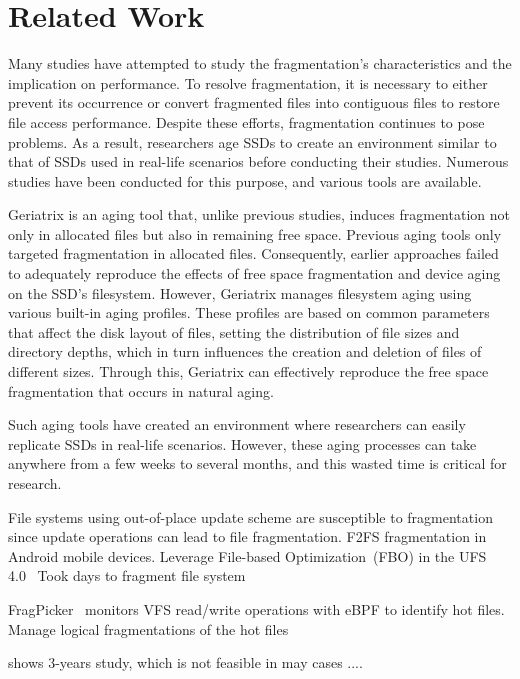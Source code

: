 \section{Related Work}
\label{s:related}

Many studies have attempted to study the fragmentation's characteristics and the implication on performance.
To resolve fragmentation, it is necessary to either prevent its occurrence or convert fragmented files into contiguous files to restore file access performance.
Despite these efforts, fragmentation continues to pose problems.
As a result, researchers age SSDs to create an environment similar to that of SSDs used in real-life scenarios before conducting their studies.
Numerous studies have been conducted for this purpose, and various tools are available.

Geriatrix\cite{geriatrix:atc18} is an aging tool that, unlike previous studies, induces fragmentation not only in allocated files but also in remaining free space.
Previous aging tools only targeted fragmentation in allocated files.
Consequently, earlier approaches failed to adequately reproduce the effects of free space fragmentation and device aging on the SSD's filesystem.
However, Geriatrix manages filesystem aging using various built-in aging profiles. These profiles are based on common parameters that affect the disk layout of files, setting the distribution of file sizes and directory depths, which in turn influences the creation and deletion of files of different sizes. Through this, Geriatrix can effectively reproduce the free space fragmentation that occurs in natural aging.

Such aging tools have created an environment where researchers can easily replicate SSDs in real-life scenarios.
However, these aging processes can take anywhere from a few weeks to several months, and this wasted time is critical for research.


File systems using out-of-place update scheme are susceptible to fragmentation since update operations can lead to file fragmentation.
\cite{f2fs-mobile:nvmsa24} F2FS fragmentation in Android mobile devices.
Leverage File-based Optimization~(FBO) in the UFS 4.0~\cite{ufs4.0}
Took days to fragment file system


FragPicker~\cite{fragpicker:sosp21} monitors VFS read/write operations with eBPF to identify hot files.
Manage logical fragmentations of the hot files


\cite{fs-aging:sigmetrics97} shows 3-years study, which is not feasible in may cases
....
